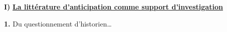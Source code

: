\documentclass[letterpaper,portrait,12pt]{article}
\begin{document}
\textbf{{\LARGE I) }}\textbf{{\LARGE \uline{La litt\'{e}rature d'anticipation comme support d'investigation}}}











\textbf{1. }Du questionnement d'historien\ldots{}
\end{document}
